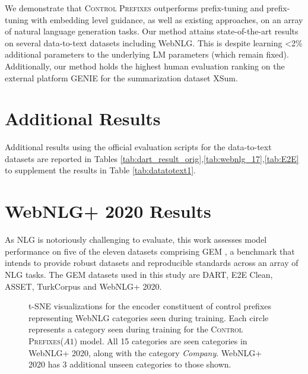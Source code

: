 \documentclass[11pt]{article}
\newcommand{\control}{\textsc{Control Prefixes}\xspace}
\begin{document}
We demonstrate that \control outperforms prefix-tuning and prefix-tuning with embedding level guidance, as well as existing approaches, on an
array of natural language generation tasks. Our method attains state-of-the-art results on several data-to-text datasets including WebNLG. This is despite learning <2\% additional parameters to the underlying LM parameters (which remain fixed).  
Additionally, our method holds the highest human evaluation ranking on the external platform GENIE for the summarization dataset XSum. 

\clearpage









\clearpage

\appendix
\label{sec:appendix}




\section{Additional Results}

\label{app:addition}
Additional results using the official evaluation scripts for the data-to-text datasets are reported in Tables \ref{tab:dart_result_orig},\ref{tab:webnlg_17},\ref{tab:E2E} to supplement the results in Table \ref{tab:datatotext1}. 




\section{WebNLG+ 2020 Results}
\label{app:web2020}

As NLG is notoriously challenging to evaluate, this work assesses model performance on five of the eleven datasets comprising GEM \citep{gem}, a benchmark that intends to provide robust datasets and 
reproducible standards across an array of NLG tasks. The GEM datasets used in this study are DART, E2E Clean, ASSET, TurkCorpus and WebNLG+ 2020. 

\begin{figure}[h]
    \centering
    \qquad
    \caption{t-SNE visualizations for the encoder constituent of control prefixes representing WebNLG categories seen during training. Each circle represents a category seen during training for the \control ($A1$) model.  All 15 categories are seen categories in WebNLG+ 2020, along with the
category \emph{Company}. WebNLG+ 2020 has 3 additional unseen categories to those shown.}\label{fig:web_cats_tsne}\end{figure}
\end{document}
